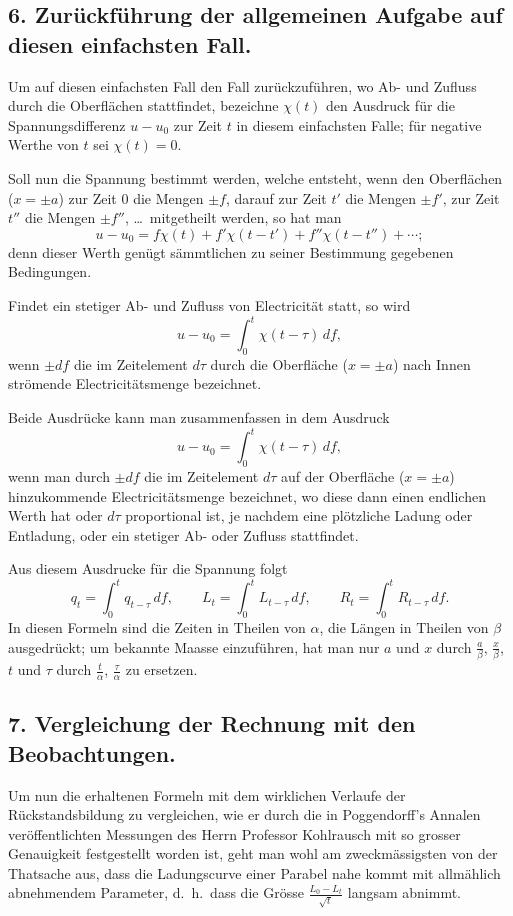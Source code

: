 \documentclass[12pt,a4paper]{article}
\begin{document}
\subsection*{6. Zur\"uckf\"uhrung der allgemeinen Aufgabe auf diesen einfachsten Fall.}

Um auf diesen einfachsten Fall den Fall zur\"uckzuf\"uhren, wo Ab- und Zufluss durch die Oberfl\"achen stattfindet, bezeichne $\chi(t)$ den Ausdruck f\"ur die Spannungsdifferenz $u - u_0$ zur Zeit $t$ in diesem einfachsten Falle; f\"ur negative Werthe von $t$ sei $\chi(t) = 0$.

Soll nun die Spannung bestimmt werden, welche entsteht, wenn den Oberfl\"achen ($x = \pm a$) zur Zeit $0$ die Mengen $\pm f$, darauf zur Zeit $t'$ die Mengen $\pm f'$, zur Zeit $t''$ die Mengen $\pm f''$, \ldots\ mitgetheilt werden, so hat man
\[
u - u_0 = f\chi(t) + f'\chi(t-t') + f''\chi(t-t'') + \cdots;
\]
denn dieser Werth gen\"ugt s\"ammtlichen zu seiner Bestimmung gegebenen Bedingungen.

Findet ein stetiger Ab- und Zufluss von Electricit\"at statt, so wird
\[
u - u_0 = \int_0^t \chi(t-\tau)\,df,
\]
wenn $\pm df$ die im Zeitelement $d\tau$ durch die Oberfl\"ache ($x = \pm a$) nach Innen str\"omende Electricit\"atsmenge bezeichnet.

Beide Ausdr\"ucke kann man zusammenfassen in dem Ausdruck
\[
u - u_0 = \int_0^t \chi(t-\tau)\,df,
\]
wenn man durch $\pm df$ die im Zeitelement $d\tau$ auf der Oberfl\"ache ($x = \pm a$) hinzukommende Electricit\"atsmenge bezeichnet, wo diese dann einen endlichen Werth hat oder $d\tau$ proportional ist, je nachdem eine pl\"otzliche Ladung oder Entladung, oder ein stetiger Ab- oder Zufluss stattfindet.

Aus diesem Ausdrucke f\"ur die Spannung folgt
\[
q_t = \int_0^t q_{t-\tau}\,df, \qquad L_t = \int_0^t L_{t-\tau}\,df, \qquad R_t = \int_0^t R_{t-\tau}\,df.
\]
In diesen Formeln sind die Zeiten in Theilen von $\alpha$, die L\"angen in Theilen von $\beta$ ausgedr\"uckt; um bekannte Maasse einzuf\"uhren, hat man nur $a$ und $x$ durch $\frac{a}{\beta}$, $\frac{x}{\beta}$, $t$ und $\tau$ durch $\frac{t}{\alpha}$, $\frac{\tau}{\alpha}$ zu ersetzen.

\subsection*{7. Vergleichung der Rechnung mit den Beobachtungen.}

Um nun die erhaltenen Formeln mit dem wirklichen Verlaufe der R\"uckstandsbildung zu vergleichen, wie er durch die in Poggendorff's Annalen ver\"offentlichten Messungen des Herrn Professor Kohlrausch mit so grosser Genauigkeit festgestellt worden ist, geht man wohl am zweckm\"assigsten von der Thatsache aus, dass die Ladungscurve einer Parabel nahe kommt mit allm\"ahlich abnehmendem Parameter, d.\ h.\ dass die Gr\"osse $\frac{L_0 - L_t}{\sqrt{t}}$ langsam abnimmt.
\end{document}
